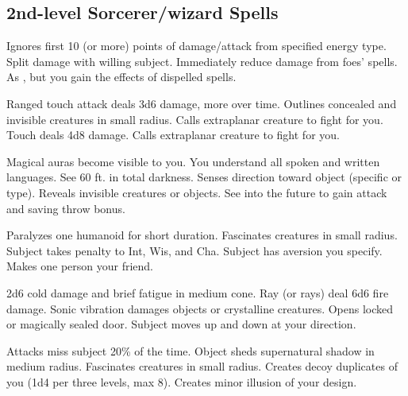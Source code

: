 \subsection{2nd-level Sorcerer/wizard Spells} 
\begin{swspelllist}
 Ignores first 10 (or more) points of damage/attack from specified energy type.
 Split damage with willing subject.
 Immediately reduce damage from foes' spells.
 As , but you gain the effects of dispelled spells.

 Ranged touch attack deals 3d6 damage, more over time.
 Outlines concealed and invisible creatures in small radius.
 Calls extraplanar creature to fight for you.
 Touch deals 4d8 damage.
 Calls extraplanar creature to fight for you.

 Magical auras become visible to you.
 You understand all spoken and written languages.
 See 60 ft. in total darkness.
 Senses direction toward object (specific or type).
 Reveals invisible creatures or objects.
\spellheadrestricted{}
 See into the future to gain attack and saving throw bonus.

 Paralyzes one humanoid for short duration.
 Fascinates creatures in small radius.
 Subject takes  penalty to Int, Wis, and Cha.
 Subject has aversion you specify.
 Makes one person your friend.

 2d6 cold damage and brief fatigue in medium cone.
 Ray (or rays) deal 6d6 fire damage.
 Sonic vibration damages objects or crystalline creatures.
 Opens locked or magically sealed door.
 Subject moves up and down at your direction.

 Attacks miss subject 20\% of the time.
 Object sheds supernatural shadow in medium radius.
 Fascinates creatures in small radius.
 Creates decoy duplicates of you (1d4  per three levels, max 8).
 Creates minor illusion of your design.


\end{swspelllist}
